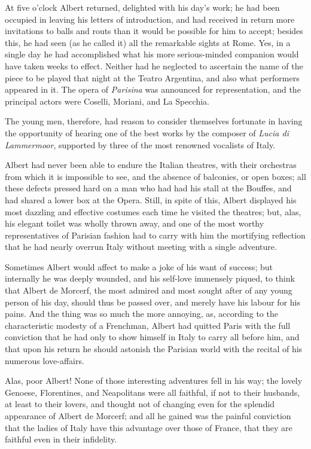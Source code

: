 At five o'clock Albert returned, delighted with his day's work; he had been occupied in leaving his letters of introduction, and had received in return more invitations to balls and routs than it would be possible for him to accept; besides this, he had seen (as he called it) all the remarkable sights at Rome. Yes, in a single day he had accomplished what his more serious-minded companion would have taken weeks to effect. Neither had he neglected to ascertain the name of the piece to be played that night at the Teatro Argentina, and also what performers appeared in it. The opera of \textit{Parisina} was announced for representation, and the principal actors were Coselli, Moriani, and La Specchia. 

 The young men, therefore, had reason to consider themselves fortunate in having the opportunity of hearing one of the best works by the composer of \textit{Lucia di Lammermoor}, supported by three of the most renowned vocalists of Italy. 

 Albert had never been able to endure the Italian theatres, with their orchestras from which it is impossible to see, and the absence of balconies, or open boxes; all these defects pressed hard on a man who had had his stall at the Bouffes, and had shared a lower box at the Opera. Still, in spite of this, Albert displayed his most dazzling and effective costumes each time he visited the theatres; but, alas, his elegant toilet was wholly thrown away, and one of the most worthy representatives of Parisian fashion had to carry with him the mortifying reflection that he had nearly overrun Italy without meeting with a single adventure. 

 Sometimes Albert would affect to make a joke of his want of success; but internally he was deeply wounded, and his self-love immensely piqued, to think that Albert de Morcerf, the most admired and most sought after of any young person of his day, should thus be passed over, and merely have his labour for his pains. And the thing was so much the more annoying, as, according to the characteristic modesty of a Frenchman, Albert had quitted Paris with the full conviction that he had only to show himself in Italy to carry all before him, and that upon his return he should astonish the Parisian world with the recital of his numerous love-affairs. 

 Alas, poor Albert! None of those interesting adventures fell in his way; the lovely Genoese, Florentines, and Neapolitans were all faithful, if not to their husbands, at least to their lovers, and thought not of changing even for the splendid appearance of Albert de Morcerf; and all he gained was the painful conviction that the ladies of Italy have this advantage over those of France, that they are faithful even in their infidelity. 


